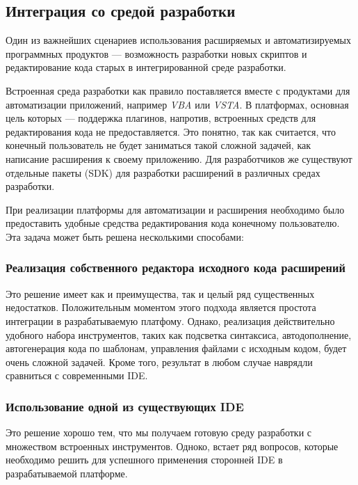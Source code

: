 \subsection{Интеграция со средой разработки}
\label{sec:ide-integration}

Один из важнейших сценариев использования расширяемых и автоматизируемых программных продуктов --- возможность разработки новых скриптов и редактирование кода старых в интегрированной среде разработки.

Встроенная среда разработки как правило поставляется вместе с продуктами для автоматизации приложений, например {\it VBA} или {\it VSTA}. В платформах, основная цель которых --- поддержка плагинов, напротив, встроенных средств для редактирования кода не предоставляется. Это понятно, так как считается, что конечный пользователь не будет заниматься такой сложной задачей, как написание расширения к своему приложению. Для разработчиков же существуют отдельные пакеты (SDK) для разработки расширений в различных средах разработки.

При реализации платформы для автоматизации и расширения необходимо было предоставить удобные средства редактирования кода конечному пользователю. Эта задача может быть решена несколькими способами:

\subsubsection{Реализация собственного редактора исходного кода расширений}

Это решение имеет как и преимущества, так и целый ряд существенных недостатков. Положительным моментом этого подхода является простота интеграции в разрабатываемую платфому. Однако, реализация действительно удобного набора инструментов, таких как подсветка синтаксиса, автодополнение, автогенерация кода по шаблонам, управления файлами с исходным кодом, будет очень сложной задачей. Кроме того, результат в любом случае наврядли сравниться с современными IDE.

\subsubsection{Использование одной из существующих IDE}

Это решение хорошо тем, что мы получаем готовую среду разработки с множеством встроенных инструментов. Одноко, встает ряд вопросов, которые необходимо решить для успешного применения сторонней IDE в разрабатываемой платформе.

